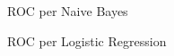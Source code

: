 \begin{figure}[H]
  \centering
  
  \caption{ROC per Naive Bayes}
  \label{roc_nb}
\end{figure}

\begin{figure}[H]
  \centering
  
  \caption{ROC per Logistic Regression}
  \label{roc_lr}
\end{figure}

